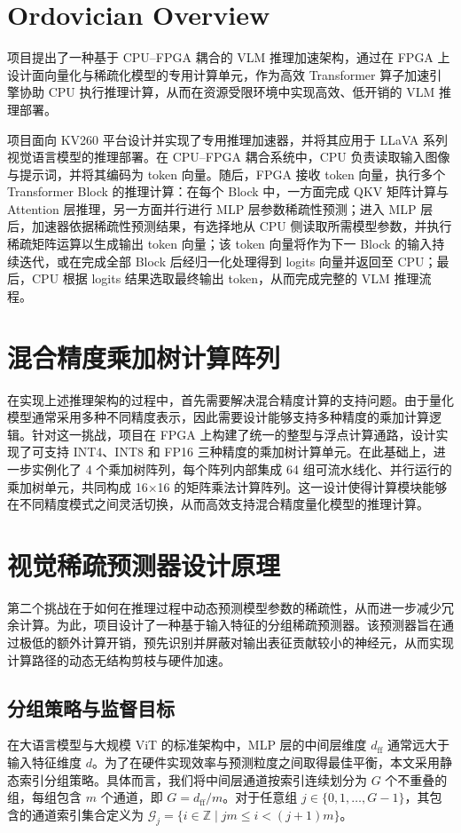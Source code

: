 \documentclass[sigconf]{acmart}
\begin{document}
\section{Ordovician Overview}
	
	项目提出了一种基于 CPU–FPGA 耦合的 VLM 推理加速架构，通过在 FPGA 上设计面向量化与稀疏化模型的专用计算单元，作为高效 Transformer 算子加速引擎协助 CPU 执行推理计算，从而在资源受限环境中实现高效、低开销的 VLM 推理部署。

	项目面向 KV260 平台设计并实现了专用推理加速器，并将其应用于 LLaVA 系列视觉语言模型的推理部署。在 CPU–FPGA 耦合系统中，CPU 负责读取输入图像与提示词，并将其编码为 token 向量。随后，FPGA 接收 token 向量，执行多个 Transformer Block 的推理计算：在每个 Block 中，一方面完成 QKV 矩阵计算与 Attention 层推理，另一方面并行进行 MLP 层参数稀疏性预测；进入 MLP 层后，加速器依据稀疏性预测结果，有选择地从 CPU 侧读取所需模型参数，并执行稀疏矩阵运算以生成输出 token 向量；该 token 向量将作为下一 Block 的输入持续迭代，或在完成全部 Block 后经归一化处理得到 logits 向量并返回至 CPU；最后，CPU 根据 logits 结果选取最终输出 token，从而完成完整的 VLM 推理流程。
	
	
	\section{混合精度乘加树计算阵列}
	
	在实现上述推理架构的过程中，首先需要解决混合精度计算的支持问题。由于量化模型通常采用多种不同精度表示，因此需要设计能够支持多种精度的乘加计算逻辑。针对这一挑战，项目在 FPGA 上构建了统一的整型与浮点计算通路，设计实现了可支持 INT4、INT8 和 FP16 三种精度的乘加树计算单元。在此基础上，进一步实例化了 4 个乘加树阵列，每个阵列内部集成 64 组可流水线化、并行运行的乘加树单元，共同构成 16×16 的矩阵乘法计算阵列。这一设计使得计算模块能够在不同精度模式之间灵活切换，从而高效支持混合精度量化模型的推理计算。
	
\section{视觉稀疏预测器设计原理}
第二个挑战在于如何在推理过程中动态预测模型参数的稀疏性，从而进一步减少冗余计算。为此，项目设计了一种基于输入特征的分组稀疏预测器。该预测器旨在通过极低的额外计算开销，预先识别并屏蔽对输出表征贡献较小的神经元，从而实现计算路径的动态无结构剪枝与硬件加速。

\subsection{分组策略与监督目标}
在大语言模型与大规模 ViT 的标准架构中，MLP 层的中间层维度 $d_{\mathrm{ff}}$ 通常远大于输入特征维度 $d$。为了在硬件实现效率与预测粒度之间取得最佳平衡，本文采用静态索引分组策略。具体而言，我们将中间层通道按索引连续划分为 $G$ 个不重叠的组，每组包含 $m$ 个通道，即 $G = d_{\mathrm{ff}} / m$。对于任意组 $j \in \{0, 1, \dots, G-1\}$，其包含的通道索引集合定义为 $\mathcal{G}_j = \{i \in \mathbb{Z} \mid jm \le i < (j+1)m \}$。
\end{document}
